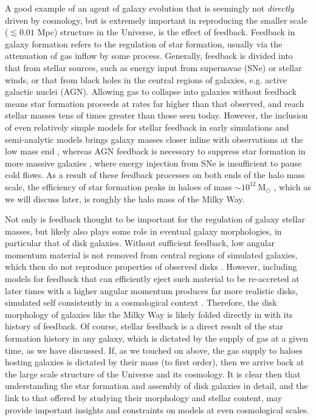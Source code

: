 A good example of an agent of galaxy evolution that is seemingly not \emph{directly} driven by cosmology, but is extremely important in reproducing the smaller scale ($\lesssim 0.01$ Mpc) structure in the Universe, is the effect of feedback. Feedback in galaxy formation refers to the regulation of star formation, usually via the attenuation of gas inflow by some process. Generally, feedback is divided into that from stellar sources, such as energy input from supernovae (SNe) or stellar winds, or that from black holes in the central regions of galaxies, e.g. active galactic nuclei (AGN). Allowing gas to collapse into galaxies without feedback means star formation proceeds at rates far higher than that observed, and reach stellar masses tens of times greater than those seen today. However, the inclusion of even relatively simple models for stellar feedback in early simulations and semi-analytic models brings galaxy masses closer inline with observations at the low mass end  \citep[$M\lesssim 10^{12}\ \mathrm{M_\odot}$ e.g.][]{1996ApJS..105...19K,1999MNRAS.310.1087S,2003MNRAS.339..312S}, whereas AGN feedback is necessary to suppress star formation in more massive galaxies \citep[$M\gtrsim 10^{12}\ \mathrm{M_\odot}$][]{2006MNRAS.370..645B,2008MNRAS.391..481S}, where energy injection from SNe is insufficient to pause cold flows. As a result of these feedback processes on both ends of the halo mass scale, the efficiency of star formation peaks in haloes of mass $\sim 10^{12}\ \mathrm{M_\odot}$ \citep[e.g.][]{2013ApJ...770...57B}, which as we will discuss later, is roughly the halo mass of the Milky Way. 

Not only is feedback thought to be important for the regulation of galaxy stellar masses, but likely also plays some role in eventual galaxy morphologies, in particular that of disk galaxies. Without sufficient feedback, low angular momentum material is not removed from central regions of simulated galaxies, which then do not reproduce properties of observed disks \citep[e.g.][and references therein]{2010MNRAS.408..812S}. However, including models for feedback that can efficiently eject such material to be re-accreted at later times with a higher angular momentum produces far more realistic disks, simulated self consistently in a cosmological context \citep[e.g.][]{2011MNRAS.415.1051B,2012MNRAS.427..379M,2013MNRAS.428..129S}. Therefore, the disk morphology of galaxies like the Milky Way is likely folded directly in with its history of feedback. Of course, stellar feedback is a direct result of the star formation history in any galaxy, which is dictated by the supply of gas at a given time, as we have discussed. If, as we touched on above, the gas supply to haloes hosting galaxies is dictated by their mass (to first order), then we arrive back at the large scale structure of the Universe and its cosmology. It is clear then that understanding the star formation and assembly of disk galaxies in detail, and the link to that offered by studying their morphology and stellar content, may provide important insights and constraints on models at even cosmological scales.


